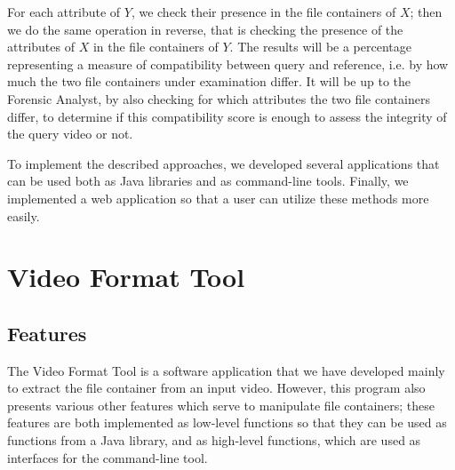 For each attribute of $Y$, we check their presence in the file containers of $X$; then we do the same operation in reverse, that is checking the presence of the attributes of $X$ in the file containers of $Y$. The results will be a percentage representing a measure of compatibility between query and reference, i.e. by how much the two file containers under examination differ. It will be up to the Forensic Analyst, by also checking for which attributes the two file containers differ, to determine if this compatibility score is enough to assess the integrity of the query video or not. \newline

To implement the described approaches, we developed several applications that can be used both as Java libraries and as command-line tools. Finally, we implemented a web application so that a user can utilize these methods more easily.

\section{Video Format Tool}

\subsection{Features}

The Video Format Tool is a software application that we have developed mainly to extract the file container from an input video. However, this program also presents various other features which serve to manipulate file containers; these features are both implemented as low-level functions so that they can be used as functions from a Java library, and as high-level functions, which are used as interfaces for the command-line tool.

